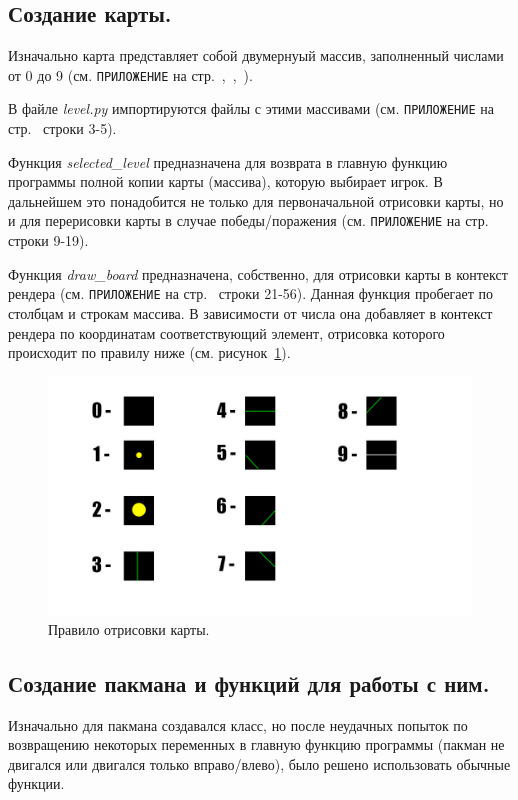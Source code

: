 \subsection{\label{subsec:ch02/sec01/sub04}Создание карты.}
Изначально карта представляет собой двумернуый массив, заполненный числами от 0 до 9 (см. \texttt{ПРИЛОЖЕНИЕ} на стр.~\pageref{code:b1},~\pageref{code:b2},~\pageref{code:b3}).

В файле \textit{level.py} импортируются файлы с этими массивами (см. \texttt{ПРИЛОЖЕНИЕ} на стр.~\pageref{code:level} строки 3-5).

Функция \textit{selected\_level} предназначена для возврата в главную функцию программы полной копии карты (массива), которую выбирает игрок. В дальнейшем это понадобится не только для первоначальной отрисовки карты, но и для перерисовки карты в случае победы/поражения (см. \texttt{ПРИЛОЖЕНИЕ} на стр.~\pageref{code:level} строки 9-19).

Функция \textit{draw\_board} предназначена, собственно, для отрисовки карты в контекст рендера (см. \texttt{ПРИЛОЖЕНИЕ} на стр.~\pageref{code:level} строки 21-56). Данная функция пробегает по столбцам и строкам массива. В зависимости от числа она добавляет в контекст рендера по координатам соответствующий элемент, отрисовка которого происходит по правилу ниже (см. рисунок~\ref{fig1}).
\begin{figure}[H]
	\centering
	\includegraphics[width=1\linewidth]{images/карта.png}
	\caption{Правило отрисовки карты.}
	\label{fig1}
\end{figure}

\subsection{\label{subsec:ch02/sec01/sub05}Создание пакмана и функций для работы с ним.}
Изначально для пакмана создавался класс, но после неудачных попыток по возвращению некоторых переменных в главную функцию программы (пакман не двигался или двигался только вправо/влево), было решено использовать обычные функции.


